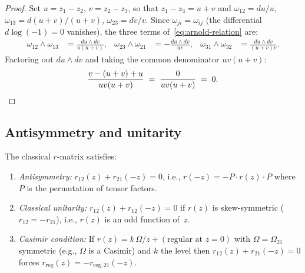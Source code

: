 \begin{proof}
Set $u = z_1 - z_2$, $v = z_2 - z_3$, so that
$z_1 - z_3 = u + v$ and $\omega_{12} = du/u$,
$\omega_{13} = d(u+v)/(u+v)$, $\omega_{23} = dv/v$.
Since $\omega_{ji} = \omega_{ij}$ (the differential
$d\log(-1) = 0$ vanishes), the three terms of~\eqref{eq:arnold-relation} are:
\begin{align*}
\omega_{12} \wedge \omega_{13}
&= \frac{du \wedge dv}{u(u+v)}, &
\omega_{23} \wedge \omega_{21}
&= -\frac{du \wedge dv}{uv}, &
\omega_{31} \wedge \omega_{32}
&= \frac{du \wedge dv}{(u+v)v}.
\end{align*}
Factoring out $du \wedge dv$ and taking the common denominator
$uv(u+v)$:
\[
\frac{v - (u+v) + u}{uv(u+v)}
\;=\;
\frac{0}{uv(u+v)}
\;=\; 0.
\qedhere
\]
\end{proof}

\subsection{Antisymmetry and unitarity}

\begin{proposition}
The classical $r$-matrix satisfies:
\begin{enumerate}[label=\textup{(\roman*)}]
\item \emph{Antisymmetry:}
$r_{12}(z) + r_{21}(-z) = 0$, i.e., $r(-z) = -P \cdot r(z)
\cdot P$ where $P$ is the permutation of tensor factors.
\item \emph{Classical unitarity:}
$r_{12}(z) + r_{12}(-z) = 0$ if $r(z)$ is skew-symmetric
($r_{12} = -r_{21}$), i.e., $r(z)$ is an odd function of~$z$.
\item \emph{Casimir condition:}
If $r(z) = k\,\Omega/z + (\text{regular at } z = 0)$ with
$\Omega = \Omega_{21}$ symmetric (e.g., $\Omega$ is a Casimir)
and $k$ the level then $r_{12}(z) + r_{21}(-z) = 0$ forces
$r_{\mathrm{reg}}(z) = -r_{\mathrm{reg},21}(-z)$.
\end{enumerate}
\end{proposition}

